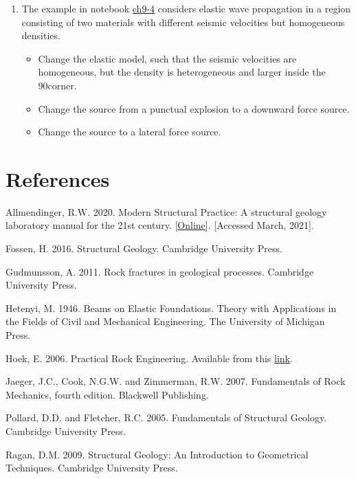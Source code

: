\documentclass[a4paper , 12pt]{book}
\begin{document}
\begin{enumerate}
\begin{itemize}
    \end{itemize}
    
    \item The example in notebook \href{https://github.com/nfcd/compGeo/blob/master/source/notebooks/ch9-4.ipynb}{ch9-4} considers elastic wave propagation in a region consisting of two materials with different seismic velocities but homogeneous densities.
    
    \begin{itemize}
        \item Change the elastic model, such that the seismic velocities are homogeneous, but the density is heterogeneous and larger inside the 90\degree corner.
        \item Change the source from a punctual explosion to a downward force source.
        \item Change the source to a lateral force source.
    \end{itemize}

\end{enumerate}

\section*{References}

Allmendinger, R.W. 2020. Modern Structural Practice: A structural geology laboratory manual for the 21st century. [\href{https://www.rickallmendinger.net/download}{Online}]. [Accessed March, 2021].

Fossen, H. 2016. Structural Geology. Cambridge University Press.

Gudmunsson, A. 2011. Rock fractures in geological processes. Cambridge University Press.

Hetenyi, M. 1946. Beams on Elastic Foundations. Theory with Applications in the Fields of Civil and Mechanical Engineering. The University of Michigan Press.

Hoek, E. 2006. Practical Rock Engineering. Available from this \href{https://www.rocscience.com/assets/resources/learning/hoek/Practical-Rock-Engineering-Full-Text.pdf}{link}.

Jaeger, J.C., Cook, N.G.W. and Zimmerman, R.W. 2007. Fundamentals of Rock Mechanics, fourth edition. Blackwell Publishing.

Pollard, D.D. and Fletcher, R.C. 2005. Fundamentals of Structural Geology. Cambridge University Press.

Ragan, D.M. 2009. Structural Geology: An Introduction to Geometrical Techniques. Cambridge University Press.
\end{document}
